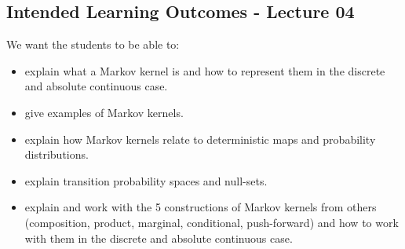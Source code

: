 \subsection*{Intended Learning Outcomes - Lecture 04}

We want the students to be able to:
\begin{itemize}
\item explain what a Markov kernel is and how to represent them in the discrete and absolute continuous case.
\item give examples of Markov kernels.
\item explain how Markov kernels relate to deterministic maps and probability distributions.
\item explain transition probability spaces and null-sets.
\item explain and work with the 5 constructions of Markov kernels from others 
    (composition, product, marginal, conditional, push-forward) 
    and how to work with them in the discrete and absolute continuous case.
\end{itemize}
